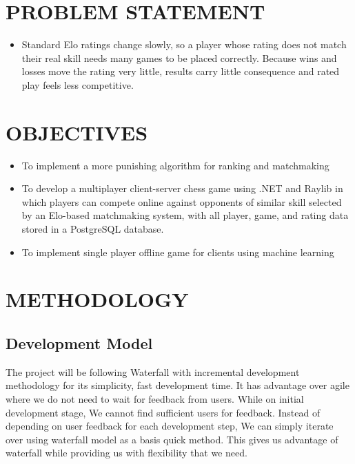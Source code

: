 \chapter{PROBLEM STATEMENT}
\label{sec:problem}

\begin{itemize}[leftmargin=1.5em]
  \item Standard Elo ratings change slowly, so a player whose rating does not match their real skill needs many games to be placed correctly. Because wins and losses move the rating very little, results carry little consequence and rated play feels less competitive.
\end{itemize}


\chapter{OBJECTIVES}
\label{sec:objectives}

\begin{itemize}[leftmargin=1.5em]
  \item To implement a more punishing algorithm for ranking and matchmaking
  \item To develop a multiplayer client-server chess game using .NET and Raylib in which players can compete online against opponents of similar skill selected by an Elo-based matchmaking system, with all player, game, and rating data stored in a PostgreSQL database.
  \item To implement single player offline game for clients using machine learning
\end{itemize}


\chapter{METHODOLOGY}
\label{ch:methodology}
\section{Development Model}

The project will be following Waterfall with incremental development methodology for its simplicity, fast development time. It has advantage over agile where we do not need to wait for feedback from users. While on initial development stage, We cannot find sufficient users for feedback. Instead of depending on user feedback for each development step, We can simply iterate over using waterfall model as a basis quick method. This gives us advantage of waterfall while providing us with flexibility that we need.

